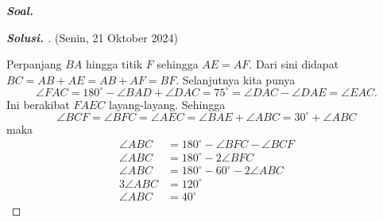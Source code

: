 \textbf{\textit{Soal. }} 
\begin{proof}[\textbf{Solusi. }] (Senin, 21 Oktober 2024) 
    
    Perpanjang $BA$ hingga titik $F$ sehingga $AE=AF$. Dari sini didapat $BC=AB+AE=AB+AF=BF$.
    Selanjutnya kita punya 
    $$\angle FAC = 180^\circ-\angle BAD+\angle DAC = 75^\circ = \angle DAC - \angle DAE = \angle EAC.$$
    Ini berakibat $FAEC$ layang-layang. Sehingga 
    $$\angle BCF = \angle BFC = \angle AEC = \angle BAE + \angle ABC = 30^\circ + \angle ABC$$ 
    maka 
    \begin{align*}
    \angle ABC &= 180^\circ - \angle BFC - \angle BCF\\
    \angle ABC &= 180^\circ - 2\angle BFC\\
    \angle ABC &= 180^\circ - 60^\circ - 2\angle ABC\\
    3\angle ABC &= 120^\circ\\
    \angle ABC &= 40^\circ
    \end{align*}

\end{proof}